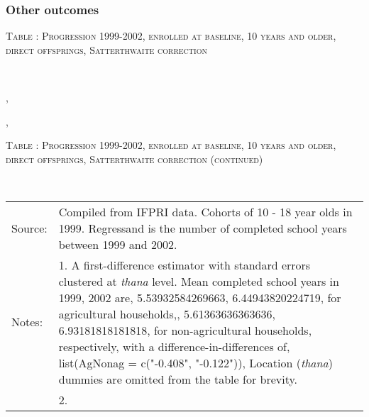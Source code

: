 \clearpage
\subsubsection{Other outcomes}

\begin{table}\hfil\textsc{\footnotesize Table \thetable: Progression 1999-2002, enrolled at baseline, 10 years and older, direct offsprings, Satterthwaite correction\label{zEm.1999.10.sameN}}\\\setlength{\tabcolsep}{1pt}\renewcommand{\arraystretch}{.675}\hspace{-2em}\hfil{}\\\renewcommand{\arraystretch}{1}\end{table}, \addtocounter{table}{-1}, \begin{table}\hfil\textsc{\footnotesize Table \thetable: Progression 1999-2002, enrolled at baseline, 10 years and older, direct offsprings, Satterthwaite correction (continued)\label{zEm.1999.10.sameN}}\\\setlength{\tabcolsep}{1pt}\renewcommand{\arraystretch}{.675}\hspace{-2em}\hfil{}\\\renewcommand{\arraystretch}{1}\hfil\begin{tabular}{>{\hfill\scriptsize}p{1cm}<{}>{\scriptsize}p{12cm}<{\hfill}} Source:& Compiled from IFPRI data. Cohorts of 10 - 18 year olds in 1999. Regressand is the number of completed school years between 1999 and 2002. \\[-1ex] Notes:& 1. A first-difference estimator with standard errors clustered at \textit{thana} level. Mean completed school years in 1999, 2002 are, 5.53932584269663, 6.44943820224719, for agricultural households,, 5.61363636363636, 6.93181818181818, for non-agricultural households, respectively, with a difference-in-differences of, list(AgNonag = c("-0.408", "-0.122")), Location (\textit{thana}) dummies are omitted from the table for brevity. \\ & 2.   \end{tabular} \end{table}




